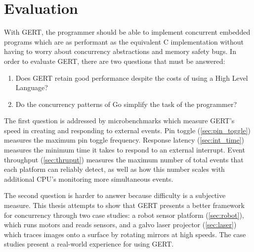 \chapter{Evaluation}

With GERT, the programmer should be able to implement concurrent embedded programs
which are as performant as the equivalent C implementation without having to
worry about concurrency abstractions and memory safety bugs. In order to evaluate GERT,
there are two questions that must be answered:

\begin{enumerate}
  \item Does GERT retain good performance despite the costs of using a High Level Language?
  \item Do the concurrency patterns of Go simplify the task of the programmer?
\end{enumerate}

The first question is addressed by microbenchmarks which measure GERT's
speed in creating and responding to external events. Pin toggle (\ref{sec:pin_toggle})
measures the maximum pin toggle frequency. Response latency (\ref{sec:int_time})
measures the minimum time it takes to respond to an external interrupt. Event
throughput (\ref{sec:thruput}) measures the maximum number of total events that each platform
can reliably detect, as well as how this number scales with additional CPU's monitoring
more simultaneous events.


The second question is harder to answer because difficulty is a subjective
measure. This thesis attempts to show that GERT presents a better framework for
concurrency through two case studies: a robot sensor platform (\ref{sec:robot}),
which runs motors and reads sensors, and a galvo laser projector (\ref{sec:laser})
which traces images onto a surface by rotating mirrors at high speeds. The case studies
present a real-world experience for using GERT.

